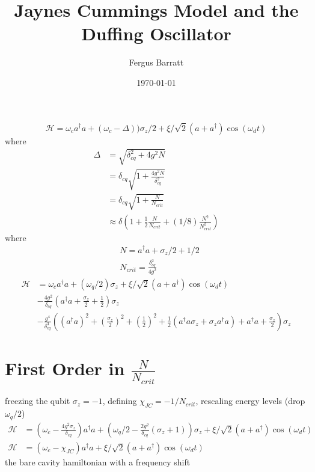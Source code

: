 \documentclass{amsart}
\title{Jaynes Cummings Model and the Duffing Oscillator}
\author{Fergus Barratt}
\date{\today}
\begin{document}
    
    \maketitle

    \begin{equation}
        \mathscr{H} = \omega_c a^ \dagger a
        + (\omega_c - \Delta)) \sigma_z/2
        + \xi / \sqrt{2} (a + a ^ \dagger ) \cos( \omega_d t )
    \end{equation}
    where
    \begin{align}
        \Delta &= \sqrt{\delta_{cq}^2 + 4g^2 N}\\
               &= \delta_{cq} \sqrt{1 + \frac{4g^2N}{\delta_{cq}^2}}\\
               &= \delta_{cq} \sqrt{1 + \frac{N}{N_{crit}}}\\
               & \approx \delta \left(
                 1
                 + \frac{1}{2}\frac{N}{N_{crit}}
                 + (1/8) \frac{N^2}{N^2_{crit}}
                 \right)
    \end{align}
    where 
    \begin{align}
        &N = a ^ \dagger a + \sigma_z/2 + 1/2\\
        &N_{crit} = \frac{\delta_{cq}^2}{4g^2}
    \end{align}
    \begin{align}
        \mathscr{H} &= \omega_c a ^ \dagger a
        + (\omega_q/2) \sigma_z
        +  \xi/\sqrt{2} (a + a^\dagger) \cos(\omega_d t)\\
        &- \frac{4g^2}{\delta_{cq}}\left(a^\dagger a 
        +  \frac{\sigma_z}{2} + \frac{1}{2}\right)\sigma_z\\
        &- \frac{g^4}{\delta_{cq}^3}\left(
        \left(a^\dagger a\right)^2
        + \left(\frac{\sigma_z}{2}\right)^2
        + \left(\frac{1}{2}\right)^2
        + \frac{1}{2} \left(
                        a^\dagger a \sigma_z + \sigma_z a^\dagger a
                      \right)
        + a^\dagger a + \frac{\sigma_z}{2}
        \right)
        \sigma_z
    \end{align}
    \section{First Order in $\frac{N}{N_{crit}}$}
    freezing the qubit $\sigma_z=-1$,
    defining $\chi_{JC} = -1/N_{crit}$,
    rescaling energy levels (drop $ \omega_q/2$)
    \begin{align}
        \mathscr{H} &= (\omega_c
        - \frac{4g^2\sigma_z}{\delta_{cq}}) a ^ \dagger a
        + (\omega_q/2 - \frac{2g^2}{\delta_{cq}} (\sigma_z + 1))\sigma_z
        + \xi/\sqrt{2} (a + a^\dagger)\cos(\omega_d t)\\
        \mathscr{H} &= \left(\omega_c-\chi_{JC}\right) a ^ \dagger a
        + \xi/\sqrt{2} ( a + a^\dagger ) \cos(\omega_d t)
    \end{align}
    the bare cavity hamiltonian with a frequency shift
    
\end{document}
